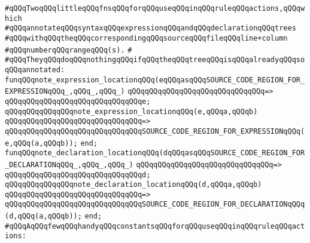\newline
\newline
\newline
\verb|#qQQqTwoqQQqlittleqQQqfnsqQQqforqQQquseqQQqinqQQqruleqQQqactions,qQQqwhich|\newline
\verb|#qQQqannotateqQQqsyntaxqQQqexpressionqQQqandqQQqdeclarationqQQqtrees|\newline
\verb|#qQQqwithqQQqtheqQQqcorrespondingqQQqsourceqQQqfileqQQqline+column|\newline
\verb|#qQQqnumberqQQqrangeqQQq(s).|\newline
\verb|#|\newline
\verb|#qQQqTheyqQQqdoqQQqnothingqQQqifqQQqtheqQQqtreeqQQqisqQQqalreadyqQQqsoqQQqannotated:|\newline
\newline
\verb|funqQQqnote_expression_locationqQQq(eqQQqasqQQqSOURCE_CODE_REGION_FOR_EXPRESSIONqQQq_,qQQq_,qQQq_)|\newline
\verb|qQQqqQQqqQQqqQQqqQQqqQQqqQQqqQQq=>|\newline
\verb|qQQqqQQqqQQqqQQqqQQqqQQqqQQqqQQqe;|\newline
\newline
\verb|qQQqqQQqqQQqqQQqnote_expression_locationqQQq(e,qQQqa,qQQqb)|\newline
\verb|qQQqqQQqqQQqqQQqqQQqqQQqqQQqqQQq=>|\newline
\verb|qQQqqQQqqQQqqQQqqQQqqQQqqQQqqQQqSOURCE_CODE_REGION_FOR_EXPRESSIONqQQq(e,qQQq(a,qQQqb));|\newline
\verb|end;|\newline
\newline
\verb|funqQQqnote_declaration_locationqQQq(dqQQqasqQQqSOURCE_CODE_REGION_FOR_DECLARATIONqQQq_,qQQq_,qQQq_)|\newline
\verb|qQQqqQQqqQQqqQQqqQQqqQQqqQQqqQQq=>|\newline
\verb|qQQqqQQqqQQqqQQqqQQqqQQqqQQqqQQqd;|\newline
\newline
\verb|qQQqqQQqqQQqqQQqnote_declaration_locationqQQq(d,qQQqa,qQQqb)|\newline
\verb|qQQqqQQqqQQqqQQqqQQqqQQqqQQqqQQq=>|\newline
\verb|qQQqqQQqqQQqqQQqqQQqqQQqqQQqqQQqSOURCE_CODE_REGION_FOR_DECLARATIONqQQq(d,qQQq(a,qQQqb));|\newline
\verb|end;|\newline
\newline
\newline
\verb|#qQQqAqQQqfewqQQqhandyqQQqconstantsqQQqforqQQquseqQQqinqQQqruleqQQqactions:|\newline
